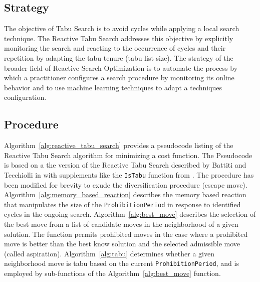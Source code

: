 \subsection{Strategy}
The objective of Tabu Search is to avoid cycles while applying a local search technique. The Reactive Tabu Search addresses this objective by explicitly monitoring the search and reacting to the occurrence of cycles and their repetition by adapting the tabu tenure (tabu list size).
The strategy of the broader field of Reactive Search Optimization is to automate the process by which a practitioner configures a search procedure by monitoring its online behavior and to use machine learning techniques to adapt a techniques configuration.

\subsection{Procedure}
Algorithm~\ref{alg:reactive_tabu_search} provides a pseudocode listing of the Reactive Tabu Search algorithm for minimizing a cost function. 
The Pseudocode is based on a the version of the Reactive Tabu Search described by Battiti and Tecchiolli in \cite{Battiti1995a} with supplements like the \texttt{IsTabu} function from \cite{Battiti1994}. The procedure has been modified for brevity to exude the diversification procedure (escape move). Algorithm~\ref{alg:memory_based_reaction} describes the memory based reaction that manipulates the size of the \texttt{ProhibitionPeriod} in response to identified cycles in the ongoing search. Algorithm~\ref{alg:best_move} describes the selection of the best move from a list of candidate moves in the neighborhood of a given solution. The function permits prohibited moves in the case where a prohibited move is better than the best know solution and the selected admissible move (called aspiration). Algorithm~\ref{alg:tabu} determines whether a given neighborhood move is tabu based on the current \texttt{ProhibitionPeriod}, and is employed by sub-functions of the Algorithm~\ref{alg:best_move} function.

